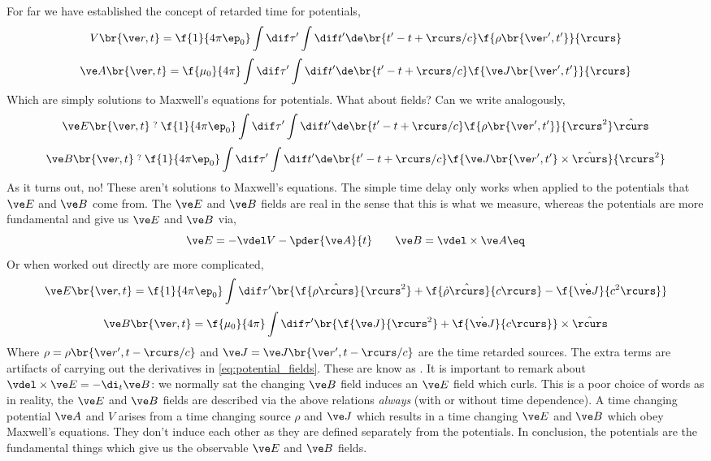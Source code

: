 \documentclass{article}
\begin{document}
For far we have established the concept of retarded time for potentials,
\[ V\br{\ve r, t} = \f{1}{4 \pi \ep_0} \int \dif \tau' \int \dif t' \de\br{t' - t + \rcurs / c}\f{\rho\br{\ve r', t'}}{\rcurs} \]
\[ \ve A\br{\ve r, t} = \f{\mu_0}{4 \pi} \int \dif \tau' \int \dif t' \de\br{t' - t + \rcurs / c}\f{\ve J\br{\ve r', t'}}{\rcurs} \]
Which are simply solutions to Maxwell's equations for potentials. What about fields? Can we write analogously,
\[ \ve E\br{\ve r, t} \stackrel{?}{} \f{1}{4 \pi \ep_0} \int \dif \tau' \int \dif t' \de\br{t' - t + \rcurs / c}\f{\rho\br{\ve r', t'}}{\rcurs^2} \hat \rcurs \]
\[ \ve B\br{\ve r, t} \stackrel{?}{} \f{1}{4 \pi \ep_0} \int \dif \tau' \int \dif t' \de\br{t' - t + \rcurs / c}\f{\ve J\br{\ve r', t'} \times \hat \rcurs}{\rcurs^2}\]
As it turns out, no! These aren't solutions to Maxwell's equations. The simple time delay only works when applied to the potentials that $\ve E$ and $\ve B$ come from. The $\ve E$ and $\ve B$ fields are real in the sense that this is what we measure, whereas the potentials are more fundamental and give us $\ve E$ and $\ve B$ via,
\[ \ve E = - \vdel V - \pder{\ve A}{t} \qquad \ve B = \vdel \times \ve A \eq \label{eq:potential_fields}\]
Or when worked out directly are more complicated,
\[ \ve E \br{\ve r, t} = \f{1}{4 \pi \ep_0} \int \dif \tau' \br{\f{\rho \hat \rcurs}{\rcurs^2} + \f{\dot \rho \hat \rcurs}{c \rcurs} - \f{\dot {\ve J}}{c^2 \rcurs}} \]
\[ \ve B \br{\ve r, t} = \f{\mu_0}{4 \pi} \int \dif \tau' \br{\f{\ve J}{\rcurs^2} + \f{\dot {\ve J}}{c \rcurs}} \times \hat \rcurs \]
Where $\rho = \rho\br{\ve r', t - \rcurs / c}$ and $\ve J = \ve J\br{\ve r', t - \rcurs / c}$ are the time retarded sources. The extra terms are artifacts of carrying out the derivatives in \cref{eq:potential_fields}. These are know as . It is important to remark about $\vdel \times \ve E = - \di_t \ve B$: we normally sat the changing $\ve B$ field induces an $\ve E$ field which curls. This is a poor choice of words as in reality, the $\ve E$ and $\ve B$ fields are described via the above relations \textit{always} (with or without time dependence). A time changing potential $\ve A$ and $V$ arises from a time changing source $\rho$ and $\ve J$ which results in a time changing $\ve E$ and $\ve B$ which obey Maxwell's equations. They don't induce each other as they are defined separately from the potentials. In conclusion, the potentials are the fundamental things which give us the observable $\ve E$ and $\ve B$ fields.\\
\end{document}
